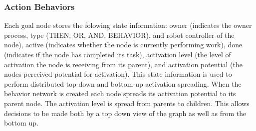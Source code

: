 \documentclass[conference]{article}
\begin{document}
\subsubsection{Action Behaviors}
\label{sub:sub:actionbehaviors}


Each goal node stores the folowing state information: owner (indicates the owner process, type (THEN, OR, AND, BEHAVIOR), and robot controller of the node), active (indicates whether the node is currently performing work), done (indicates if the node has completed its task), activation level (the level of activation the node is receiving from its parent), and activation potential (the nodes perceived potential for activation). This state information is used to perform distributed top-down and bottom-up activation spreading. When the behavior network is created each node spreads its activation potential to its parent node. The activation level is spread from parents to children. This allows decisions to be made both by a top down view of the graph as well as from the bottom up.
\end{document}
